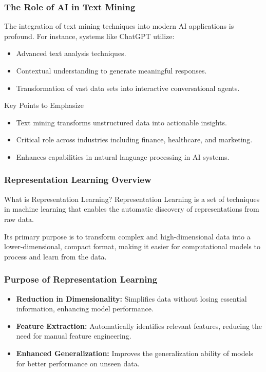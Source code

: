 \documentclass[aspectratio=169]{beamer}
\begin{document}
\begin{frame}[fragile]
    \frametitle{The Role of AI in Text Mining}
    The integration of text mining techniques into modern AI applications is profound. For instance, systems like ChatGPT utilize:
    \begin{itemize}
        \item Advanced text analysis techniques.
        \item Contextual understanding to generate meaningful responses.
        \item Transformation of vast data sets into interactive conversational agents.
    \end{itemize}
    
    \begin{block}{Key Points to Emphasize}
        \begin{itemize}
            \item Text mining transforms unstructured data into actionable insights.
            \item Critical role across industries including finance, healthcare, and marketing.
            \item Enhances capabilities in natural language processing in AI systems.
        \end{itemize}
    \end{block}
\end{frame}

\begin{frame}[fragile]
    \frametitle{Representation Learning Overview}
    \begin{block}{What is Representation Learning?}
        Representation Learning is a set of techniques in machine learning that enables the automatic discovery of representations from raw data.
    \end{block}
    Its primary purpose is to transform complex and high-dimensional data into a lower-dimensional, compact format, making it easier for computational models to process and learn from the data.
\end{frame}

\begin{frame}[fragile]
    \frametitle{Purpose of Representation Learning}
    \begin{itemize}
        \item \textbf{Reduction in Dimensionality:} Simplifies data without losing essential information, enhancing model performance.
        \item \textbf{Feature Extraction:} Automatically identifies relevant features, reducing the need for manual feature engineering.
        \item \textbf{Enhanced Generalization:} Improves the generalization ability of models for better performance on unseen data.
    \end{itemize}
\end{frame}
\end{document}
